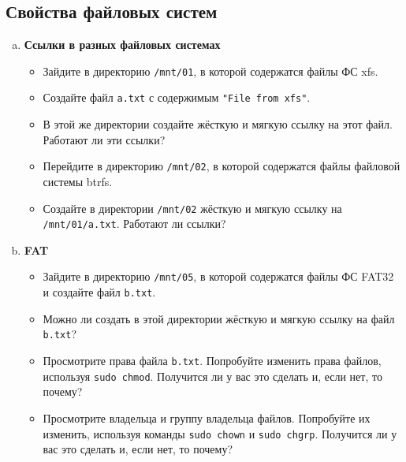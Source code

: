 \documentclass{article}
\begin{document}
\subsection{Свойства файловых систем}
\begin{enumerate}[(a)]
\item \textbf{Ссылки в разных файловых системах}
\begin{itemize}
\item Зайдите в директорию \texttt{/mnt/01}, в которой содержатся файлы ФС xfs.
\item Создайте файл \texttt{a.txt} с содержимым \texttt{"File from xfs"}.
\item В этой же директории создайте жёсткую и мягкую ссылку на этот файл. Работают ли эти ссылки?
\item Перейдите в директорию \texttt{/mnt/02}, в которой содержатся файлы файловой системы btrfs.
\item Создайте в директории \texttt{/mnt/02} жёсткую и мягкую ссылку на \texttt{/mnt/01/a.txt}. Работают ли ссылки?
\end{itemize}


\item \textbf{FAT}
\begin{itemize}
\item Зайдите в директорию \texttt{/mnt/05}, в которой содержатся файлы ФС FAT32 и создайте файл \texttt{b.txt}.
\item Можно ли создать в этой директории жёсткую и мягкую ссылку на файл \texttt{b.txt}?
\item Просмотрите права файла \texttt{b.txt}. Попробуйте изменить права файлов, используя \texttt{sudo chmod}. Получится ли у вас это сделать и, если нет, то почему?
\item Просмотрите владельца и группу владельца файлов. Попробуйте их изменить, используя команды \texttt{sudo chown} и \texttt{sudo chgrp}. Получится ли у вас это сделать и, если нет, то почему?
\iffalse
\item Используйте \texttt{stat}, чтобы распечатать метаданные файлов \texttt{a.txt} и \texttt{alpha}.
\fi
\end{itemize}


\end{enumerate}
\end{document}
